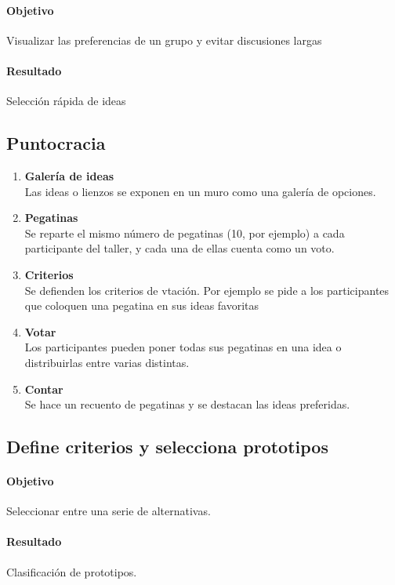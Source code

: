 \documentclass[11pt]{book}
\begin{document}
\paragraph{Objetivo}
Visualizar las preferencias de un grupo y evitar discusiones largas
\paragraph{Resultado}
Selección rápida de ideas
\subsection{Puntocracia}
\begin{enumerate}
\item \textbf{ Galería de ideas }\\
Las ideas o lienzos se exponen en un muro como una galería de opciones.
\item \textbf{ Pegatinas }\\
Se reparte el mismo número de pegatinas (10, por ejemplo) a cada participante del taller, y cada una de ellas cuenta como un voto.
\item \textbf{ Criterios }\\
Se defienden los criterios de vtación. Por ejemplo se pide a los participantes que coloquen una pegatina en sus ideas favoritas
\item \textbf{ Votar }\\
Los participantes pueden poner todas sus pegatinas en una idea o distribuirlas entre varias distintas.
\item \textbf{ Contar }\\
Se hace un recuento de pegatinas y se destacan las ideas preferidas.
\end{enumerate}
\subsection{Define criterios y selecciona prototipos}
\paragraph{Objetivo}
Seleccionar entre una serie de alternativas.
\paragraph{Resultado}
Clasificación de prototipos.
\end{document}
